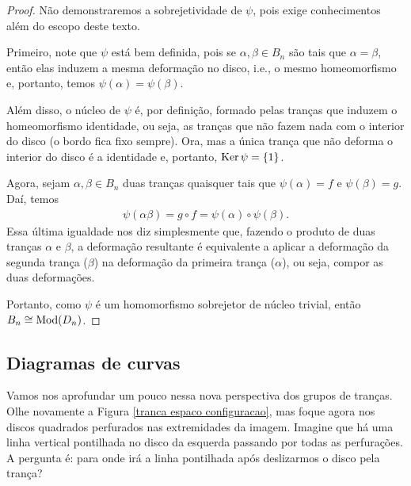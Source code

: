 	\begin{proof}
		Não demonstraremos a sobrejetividade de $\psi$, pois exige conhecimentos além do escopo 
		deste texto.
		
		\par\vspace{0.3cm} Primeiro, note que $\psi$ está bem definida, pois se $\alpha, \beta\in B_n$ 
		são tais que $\alpha = \beta$, então elas induzem a mesma deformação no disco, i.e., 
		o mesmo homeomorfismo e, portanto, temos $\psi(\alpha) = \psi(\beta)$.
		
		\par\vspace{0.3cm} Além disso, o núcleo de $\psi$ é, por definição, formado pelas 
		tranças que induzem o homeomorfismo identidade, ou seja, as tranças que não fazem nada com 
		o interior do disco (o bordo fica fixo sempre). Ora, mas a única trança que não deforma o 
		interior do disco é a identidade e, portanto, $\operatorname{Ker}\psi = \{1\}$.
		
		\par\vspace{0.3cm} Agora, sejam $\alpha, \beta\in B_n$ duas tranças quaisquer tais que 
		$\psi(\alpha) = f$ e $\psi(\beta) = g$. Daí, temos
		\begin{align*}
		    \psi(\alpha\beta) = g\circ f = \psi(\alpha)\circ\psi(\beta).
		\end{align*}
		Essa última igualdade nos diz simplesmente que, fazendo o produto de duas tranças 
		$\alpha$ e $\beta$, a deformação resultante é equivalente a aplicar a deformação 
		da segunda trança ($\beta$) na deformação da primeira trança ($\alpha$), ou seja, 
		compor as duas deformações.
		
		\par\vspace{0.3cm} Portanto, como $\psi$ é um homomorfismo sobrejetor de núcleo 
		trivial, então $B_n\cong\operatorname{Mod}(D_n)$.
	\end{proof}
	\subsection{Diagramas de curvas}
	Vamos nos aprofundar um pouco nessa nova perspectiva dos grupos de tranças. 
	Olhe novamente a Figura \ref{tranca espaco configuracao}, mas foque agora nos discos quadrados 
	perfurados nas extremidades da imagem. Imagine que há uma linha vertical pontilhada no disco 
	da esquerda passando por todas as perfurações. A pergunta é: para onde irá a linha pontilhada 
	após deslizarmos o disco pela trança?
	
